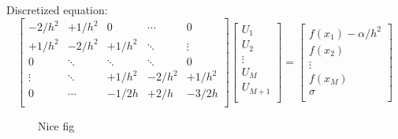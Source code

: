 Discretized equation:
\begin{equation*}
\renewcommand{\arraystretch}{2.8} %
\begin{bmatrix}
-2/h^2 & +1/h^2  & 0 & \cdots & 0 \\
+1/h^2  & -2/h^2 & +1/h^2  & \ddots & \vdots \\
0 & \ddots & \ddots & \ddots & 0 \\
\vdots & \ddots & +1/h^2 & -2/h^2 & +1/h^2\\
0 & \cdots & -1/2h & +2/h & -3/2h  \\
\end{bmatrix}
\begin{bmatrix}
U_1 \\ U_2 \\ \vdots \\ U_M \\ U_{M+1} \\
\end{bmatrix}
=
\begin{bmatrix}
f(x_1) - \alpha/h^2 \\ f(x_2) \\ \vdots \\ f(x_M) \\ \sigma \\
\end{bmatrix}
\end{equation*}

\begin{figure}
  \centering
  
  \caption{Nice fig}
\end{figure}
